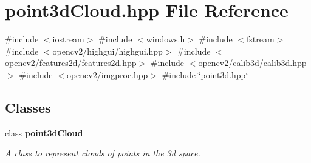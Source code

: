 \section{point3d\+Cloud.\+hpp File Reference}
\label{point3d_cloud_8hpp}
{\ttfamily \#include $<$iostream$>$}\newline
{\ttfamily \#include $<$windows.\+h$>$}\newline
{\ttfamily \#include $<$fstream$>$}\newline
{\ttfamily \#include $<$opencv2/highgui/highgui.\+hpp$>$}\newline
{\ttfamily \#include $<$opencv2/features2d/features2d.\+hpp$>$}\newline
{\ttfamily \#include $<$opencv2/calib3d/calib3d.\+hpp$>$}\newline
{\ttfamily \#include $<$opencv2/imgproc.\+hpp$>$}\newline
{\ttfamily \#include \char`\"{}point3d.\+hpp\char`\"{}}\newline
\subsection*{Classes}
\begin{DoxyCompactItemize}
\item 
class \textbf{ point3d\+Cloud}
\begin{DoxyCompactList}\small\item\em A class to represent clouds of points in the 3d space. \end{DoxyCompactList}\end{DoxyCompactItemize}
